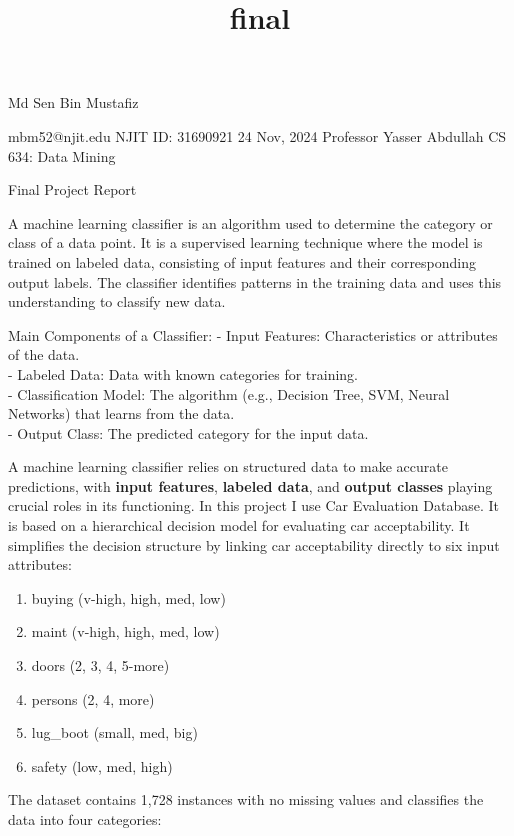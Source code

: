 \documentclass[11pt]{article}
\title{final}
\providecommand{\tightlist}{%
      \setlength{\itemsep}{0pt}\setlength{\parskip}{0pt}}
\begin{document}
    
    \maketitle
    
    

    
    Md Sen Bin Mustafiz

mbm52@njit.edu NJIT ID: 31690921 24 Nov, 2024 Professor Yasser Abdullah
CS 634: Data Mining

Final Project Report

    A machine learning classifier is an algorithm used to determine the
category or class of a data point. It is a supervised learning technique
where the model is trained on labeled data, consisting of input features
and their corresponding output labels. The classifier identifies
patterns in the training data and uses this understanding to classify
new data.

Main Components of a Classifier: - Input Features: Characteristics or
attributes of the data.\\
- Labeled Data: Data with known categories for training.\\
- Classification Model: The algorithm (e.g., Decision Tree, SVM, Neural
Networks) that learns from the data.\\
- Output Class: The predicted category for the input data.

    A machine learning classifier relies on structured data to make accurate
predictions, with \textbf{input features}, \textbf{labeled data}, and
\textbf{output classes} playing crucial roles in its functioning. In
this project I use Car Evaluation Database. It is based on a
hierarchical decision model for evaluating car acceptability. It
simplifies the decision structure by linking car acceptability directly
to six input attributes:

\begin{enumerate}
\def\labelenumi{\arabic{enumi}.}
\tightlist
\item
  buying (v-high, high, med, low)
\item
  maint (v-high, high, med, low)
\item
  doors (2, 3, 4, 5-more)
\item
  persons (2, 4, more)
\item
  lug\_boot (small, med, big)
\item
  safety (low, med, high)
\end{enumerate}

The dataset contains 1,728 instances with no missing values and
classifies the data into four categories:
\end{document}
